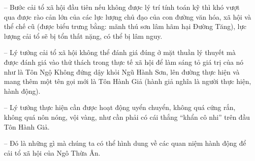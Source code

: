 -- Bước cải tổ xã hội đầu tiên nếu không được lý trí tính toán kỹ thì khó vượt qua được rào cản lớn của các lực lượng chủ đạo của con đường văn hóa, xã hội và thể chế cũ (được biểu trưng bằng: mãnh thú sơn lâm hãm hại Đường Tăng), lực lượng cải tổ sẽ bị tổn thất nặng, có thể bị lâm nguy.

-- Lý tưởng cải tổ xã hội không thể đánh giá đúng ở mặt thuần lý thuyết mà được đánh giá vào thử thách trong thực tế xã hội để làm sáng tỏ giá trị của nó như là Tôn Ngộ Không đứng dậy khỏi Ngũ Hành Sơn, lên đường thực hiện và mang thêm một tên gọi mới là Tôn Hành Giả (hành giả nghĩa là người thực hiện, hành động).

-- Lý tưởng thực hiện cần được hoạt động uyển chuyển, không quá cứng rắn, không quá nôn nóng, vội vàng, như cần phải có cái thắng ``khẩn cô nhi'' trên đầu Tôn Hành Giả.

-- Đó là những gì mà chúng ta có thể hình dung về các quan niệm hành động để cải tổ xã hội của Ngô Thừa Ân.
